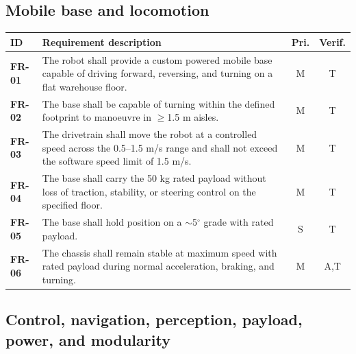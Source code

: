 \subsection*{Mobile base and locomotion}

\begin{table}[H]
\centering
\begin{tabularx}{\textwidth}{>{\bfseries}L{0.12\textwidth}Y c c}
\toprule
ID & Requirement description & Pri. & Verif. \\
\midrule
FR-01 & The robot shall provide a custom powered mobile base capable of driving forward, reversing, and turning on a flat warehouse floor. & M & T \\
FR-02 & The base shall be capable of turning within the defined footprint to manoeuvre in $\geq$1.5 m aisles. & M & T \\
FR-03 & The drivetrain shall move the robot at a controlled speed across the 0.5--1.5 m/s range and shall not exceed the software speed limit of 1.5 m/s. & M & T \\
FR-04 & The base shall carry the 50 kg rated payload without loss of traction, stability, or steering control on the specified floor. & M & T \\
FR-05 & The base shall hold position on a $\sim$5$^\circ$ grade with rated payload. & S & T \\
FR-06 & The chassis shall remain stable at maximum speed with rated payload during normal acceleration, braking, and turning. & M & A,T \\
\bottomrule
\end{tabularx}
\end{table}

\subsection*{Control, navigation, perception, payload, power, and modularity}

